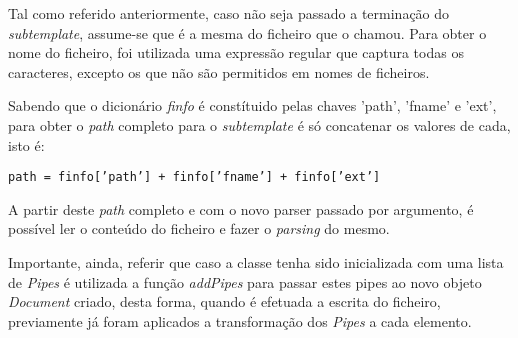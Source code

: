\documentclass[../relatorio.tex]{subfiles}
\begin{document}
    Tal como referido anteriormente, caso não seja passado a terminação do \textit{subtemplate}, assume-se que 
    é a mesma do ficheiro que o chamou. Para obter o nome do ficheiro, foi utilizada uma expressão regular que captura
    todas os caracteres, excepto os que não são permitidos em nomes de ficheiros.

    Sabendo que o dicionário \textit{finfo} é constítuido pelas chaves 'path', 'fname' e 'ext', para obter o \textit{path}
    completo para o \textit{subtemplate} é só concatenar os valores de cada, isto é:

    \texttt{path = finfo['path'] + finfo['fname'] + finfo['ext']}

    A partir deste \textit{path} completo e com o novo parser passado por argumento, é possível ler o conteúdo do ficheiro
    e fazer o \textit{parsing} do mesmo. 
    
    Importante, ainda, referir que caso a classe tenha sido inicializada com uma lista de
    \textit{Pipes} é utilizada a função \textit{addPipes} para passar estes pipes ao novo objeto \textit{Document} criado,
    desta forma, quando é efetuada a escrita do ficheiro, previamente já foram aplicados a transformação 
    dos \textit{Pipes} a cada elemento.
\end{document}
